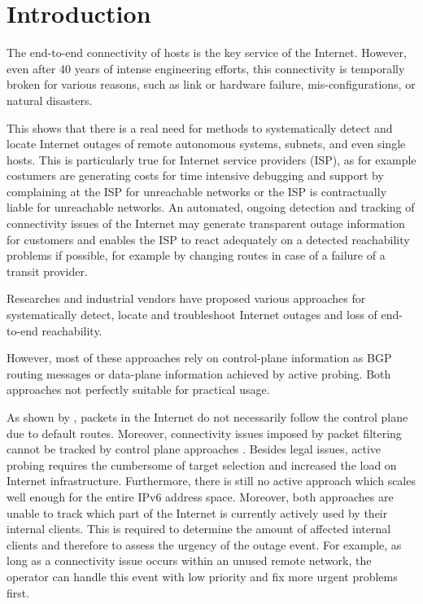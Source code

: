 

\chapter{Introduction}

The end-to-end connectivity of hosts is the key service of the Internet. However, even after 40 years of intense engineering efforts, this connectivity is temporally broken for various reasons, such as link or hardware failure\citep{}, mis-configurations\citep{}, or natural disasters\citep{}. 

This shows that there is a real need for methods to systematically detect and locate Internet outages of remote autonomous systems, subnets, and even single hosts. This is particularly true for Internet service providers (ISP), as for example costumers are generating costs for time intensive debugging and support by complaining at the ISP for unreachable networks or the ISP is contractually liable for unreachable networks. An automated, ongoing detection and tracking of connectivity issues of the Internet may generate transparent outage information for customers and enables the ISP to react adequately on a detected reachability problems if possible, for example by changing routes in case of a failure of a transit provider. 

Researches and industrial vendors have proposed various approaches for systematically detect, locate and troubleshoot Internet outages and loss of end-to-end reachability.

However, most of these approaches rely on control-plane information as BGP routing messages or data-plane information achieved by active probing. Both approaches not perfectly suitable for practical usage.

As shown by \citet{Bush:Optometry}, packets in the Internet do not necessarily follow the control plane due to default routes. Moreover, connectivity issues imposed by packet filtering cannot be tracked by control plane approaches \citep{Dainotti:2011:ACI}. Besides legal issues, active probing requires the cumbersome of target selection and increased the load on Internet infrastructure. Furthermore, there is still no active approach which scales well enough for the entire IPv6 address space. Moreover, both approaches are unable to track which part of the Internet is currently actively used by their internal clients. This is required to determine the amount of affected internal clients and therefore to assess the urgency of the outage event. For example, as long as a connectivity issue occurs within an unused remote network, the operator can handle this event with low priority and fix more urgent problems first.

